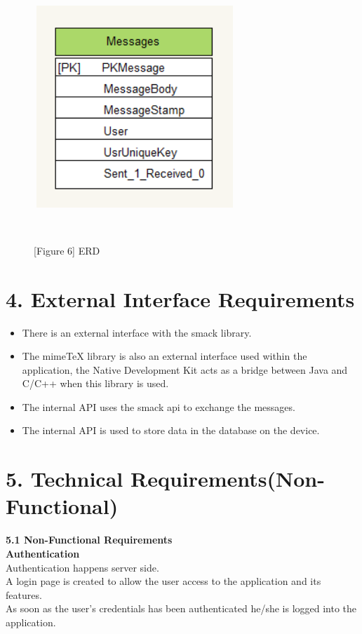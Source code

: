 \documentclass[29pt,a4paper]{moderncv}
\begin{document}
	\begin{figure}
		\centering
		\\ \includegraphics[width=3.0in, height=3.0in]{./erd.png}
		\\\caption{[Figure 6] ERD}\\
	\end{figure}
	
\newpage	
	\section*{\textbf{4. External Interface Requirements}}
	\vspace{4mm}
		\begin{itemize}
			\item There is an external interface with the smack library.
			\item The mimeTeX library is also an external interface used within the application, the Native Development Kit acts as a bridge between Java and C/C++ when this library is used.
			\item The internal API uses the smack api to exchange the messages.
			\item The internal API is used to store data in the database on the device.
		\end{itemize}

\newpage	
		\section*{\textbf{5. Technical Requirements(Non-Functional)}}
		\vspace{4mm}
		\noindent \textbf{5.1 Non-Functional Requirements}\\
		
		\noindent \textbf{Authentication}\\
			Authentication happens server side. \\
			A login page is created to allow the user access to the application and its features. \\
			As soon as the user’s credentials has been authenticated he/she is logged into the application.\\
			
\end{document}
